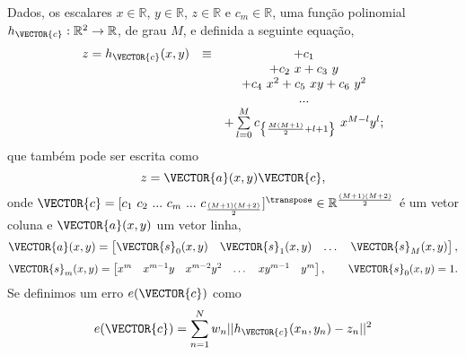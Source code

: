 \begin{myproofT}\label{proof:theo:maphxr2r1}
Dados,
os escalares $x \in \mathbb{R}$, $y \in \mathbb{R}$, $z \in \mathbb{R}$ e $c_m \in \mathbb{R}$,
uma função polinomial $h_{\VECTOR{c}}:\mathbb{R}^2 \rightarrow \mathbb{R}$, de grau $M$, e 
definida a seguinte equação,
\begin{equation}\label{eq:proof:theo:maphxr2r1:1}
\begin{matrix}
z=h_{\VECTOR{c}}(x,y) & \equiv & +c_{1}\\
              ~ & ~ & +c_{2}~x + c_{3}~y\\
              ~ & ~ & +c_{4}~x^2 +c_{5}~xy + c_{6}~y^2\\
              ~ & ~ &  ...\\
              ~ & ~ & +\sum \limits_{l=0}^{M}c_{\left\{ \frac{M(M+1)}{2}+l+1\right\}}~x^{M-l}y^{l};
\end{matrix} 
\end{equation}
que também pode ser escrita como
\begin{equation}
z=\VECTOR{a}(x,y)\VECTOR{c},
\end{equation}
onde $\VECTOR{c}=[c_1~ c_2~ ...~ c_m~ ...~ c_{\frac{(M+1)(M+2)}{2}}]^{\transpose} \in \mathbb{R}^{\frac{(M+1)(M+2)}{2}}$ é um vetor coluna e
$\VECTOR{a}(x,y)$ um vetor linha,
\begin{equation}
\VECTOR{a}(x,y)= 
\begin{bmatrix}
\VECTOR{s}_{0}(x,y) & \VECTOR{s}_{1}(x,y) &  \dots  & \VECTOR{s}_{M}(x,y)
\end{bmatrix},
\end{equation}
\begin{equation}
\VECTOR{s}_{m}(x,y)=
\begin{bmatrix}
x^m  & x^{m-1} y  & x^{m-2} y^2    & \dots  & x y^{m-1} &  y^m 
\end{bmatrix},
\qquad
\VECTOR{s}_{0}(x,y)=1.
\end{equation}
Se definimos um erro $e(\VECTOR{c})$ como
\begin{equation}\label{eq:proof:theo:maphxr2r1:2}
e(\VECTOR{c}) 
=  
\sum_{n=1}^{N} w_n||h_{\VECTOR{c}}(x_n,y_n)-z_n||^2 
\end{equation}

\end{myproofT}
